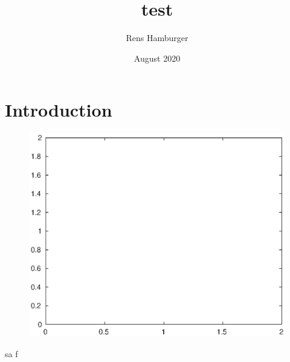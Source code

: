 \documentclass{article}
\title{test}
\author{Rens Hamburger}
\date{August 2020}
\begin{document}
\maketitle

\section{Introduction}

\begin{figure}
	\centering
	\includegraphics[width=0.6\linewidth,keepaspectratio]{figures/empty.eps}
\end{figure}
sa
f
\end{document}
